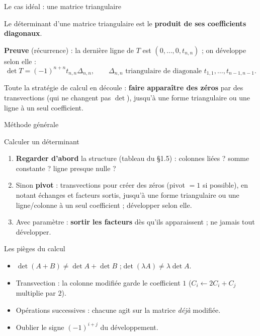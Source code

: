 \documentclass[aspectratio=169,11pt]{beamer}
\begin{document}
\begin{frame}{Le cas idéal : une matrice triangulaire}
\begin{PROP}[Théorème]
Le déterminant d'une matrice triangulaire est le \textbf{produit de ses coefficients diagonaux}.
\end{PROP}
\pause
\textbf{Preuve} (récurrence) : la dernière ligne de $T$ est $(0,\dots,0,t_{n,n})$ ; on développe selon elle :
\[\det T=(-1)^{n+n}t_{n,n}\Delta_{n,n},\qquad\Delta_{n,n}\text{ triangulaire de diagonale }t_{1,1},\dots,t_{n-1,n-1}.\]
\pause
\begin{RETENIR}
Toute la stratégie de calcul en découle : \textbf{faire apparaître des zéros} par des transvections (qui ne changent pas $\det$),
jusqu'à une forme triangulaire ou une ligne à un seul coefficient.
\end{RETENIR}
\end{frame}

\begin{frame}{Méthode générale}
\begin{METH}{Calculer un déterminant}
\begin{enumerate}
\item \textbf{Regarder d'abord} la structure (tableau du §1.5) : colonnes liées ? somme constante ? ligne presque nulle ?
\item Sinon \textbf{pivot} : transvections pour créer des zéros (pivot $=1$ si possible), en notant échanges et facteurs
      sortis, jusqu'à une forme triangulaire ou une ligne/colonne à un seul coefficient ; développer selon elle.
\item Avec paramètre : \textbf{sortir les facteurs} dès qu'ils apparaissent ; ne jamais tout développer.
\end{enumerate}
\end{METH}
\end{frame}

\begin{frame}{Les pièges du calcul}
\begin{PIEGE}[Pièges]
\begin{itemize}
\item $\det(A+B)\neq\det A+\det B$ ;\quad $\det(\lambda A)\neq\lambda\det A$.
\item Transvection : la colonne modifiée garde le coefficient $1$ ($C_i\leftarrow2C_i+C_j$ multiplie par $2$).
\item Opérations successives : chacune agit sur la matrice \emph{déjà} modifiée.
\item Oublier le signe $(-1)^{i+j}$ du développement.
\end{itemize}
\end{PIEGE}
\end{frame}
\end{document}
